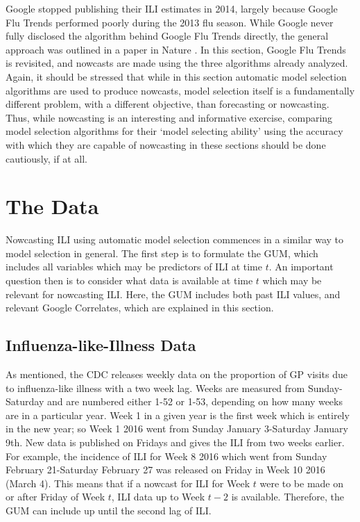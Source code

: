 Google stopped publishing their ILI estimates in 2014, largely because Google Flu Trends performed poorly during the 2013 flu season. While Google never fully disclosed the algorithm behind Google Flu Trends directly, the general approach was outlined in a paper in Nature \cite{naturegoogle}. In this section, Google Flu Trends is revisited, and nowcasts are made using the three algorithms already analyzed. Again, it should be stressed that while in this section automatic model selection algorithms are used to produce nowcasts, model selection itself is a fundamentally different problem, with a different objective, than forecasting or nowcasting. Thus, while nowcasting is an interesting and informative exercise, comparing model selection algorithms for their `model selecting ability' using the accuracy with which they are capable of nowcasting in these sections should be done cautiously, if at all.  

\section{The Data}

Nowcasting ILI using automatic model selection commences in a similar way to model selection in general. The first step is to formulate the GUM, which includes all variables which may be predictors of ILI at time $t$. An important question then is to consider what data is available at time $t$ which may be relevant for nowcasting ILI. Here, the GUM includes both past ILI values, and relevant Google Correlates, which are explained in this section.

\subsection{Influenza-like-Illness Data}

As mentioned, the CDC releases weekly data on the proportion of GP visits due to influenza-like illness with a two week lag. Weeks are measured from Sunday-Saturday and are numbered either 1-52 or 1-53, depending on how many weeks are in a particular year. Week 1 in a given year is the first week which is entirely in the new year; so Week 1 2016 went from Sunday January 3-Saturday January 9th. New data is published on Fridays and gives the ILI from two weeks earlier. For example, the incidence of ILI for Week 8 2016 which went from Sunday February 21-Saturday February 27 was released on Friday in Week 10 2016 (March 4). This means that if a nowcast for ILI for Week $t$ were to be made on or after Friday of Week $t$, ILI data up to Week $t-2$ is available. Therefore, the GUM can include up until the second lag of ILI. 


